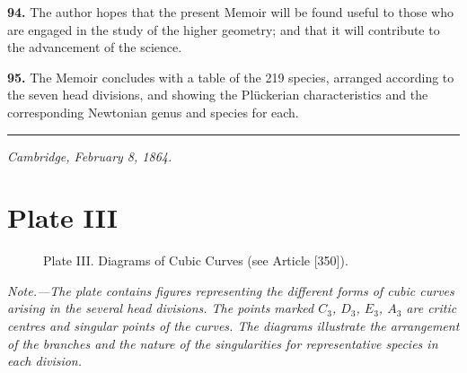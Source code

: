 \documentclass[11pt,a4paper]{article}
\theoremstyle{plain}
\theoremstyle{definition}
\begin{document}
\textbf{94.} The author hopes that the present Memoir will be found useful to those who are engaged in the study of the higher geometry; and that it will contribute to the advancement of the science.

\textbf{95.} The Memoir concludes with a table of the 219 species, arranged according to the seven head divisions, and showing the Pl\"{u}ckerian characteristics and the corresponding Newtonian genus and species for each.

\bigskip

\begin{center}
\rule{0.5\textwidth}{0.4pt}
\end{center}

\bigskip

\noindent\textit{Cambridge, February 8, 1864.}

\newpage

\section*{Plate III}

\begin{figure}[H]
\centering
{}
\caption*{Plate III. Diagrams of Cubic Curves (see Article [350]).}
\end{figure}

\bigskip

\noindent\textit{Note.---The plate contains figures representing the different forms of cubic curves arising in the several head divisions. The points marked $C_3$, $D_3$, $E_3$, $A_3$ are critic centres and singular points of the curves. The diagrams illustrate the arrangement of the branches and the nature of the singularities for representative species in each division.}

\newpage

\tableofcontents
\end{document}
